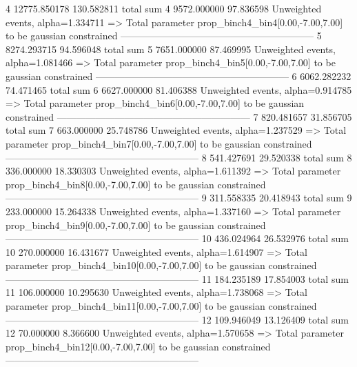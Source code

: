 4          12775.850178    130.582811      total sum                     
4          9572.000000     97.836598       Unweighted events, alpha=1.334711
  => Total parameter prop_binch4_bin4[0.00,-7.00,7.00] to be gaussian constrained
------------------------------------------------------------
5          8274.293715     94.596048       total sum                     
5          7651.000000     87.469995       Unweighted events, alpha=1.081466
  => Total parameter prop_binch4_bin5[0.00,-7.00,7.00] to be gaussian constrained
------------------------------------------------------------
6          6062.282232     74.471465       total sum                     
6          6627.000000     81.406388       Unweighted events, alpha=0.914785
  => Total parameter prop_binch4_bin6[0.00,-7.00,7.00] to be gaussian constrained
------------------------------------------------------------
7          820.481657      31.856705       total sum                     
7          663.000000      25.748786       Unweighted events, alpha=1.237529
  => Total parameter prop_binch4_bin7[0.00,-7.00,7.00] to be gaussian constrained
------------------------------------------------------------
8          541.427691      29.520338       total sum                     
8          336.000000      18.330303       Unweighted events, alpha=1.611392
  => Total parameter prop_binch4_bin8[0.00,-7.00,7.00] to be gaussian constrained
------------------------------------------------------------
9          311.558335      20.418943       total sum                     
9          233.000000      15.264338       Unweighted events, alpha=1.337160
  => Total parameter prop_binch4_bin9[0.00,-7.00,7.00] to be gaussian constrained
------------------------------------------------------------
10         436.024964      26.532976       total sum                     
10         270.000000      16.431677       Unweighted events, alpha=1.614907
  => Total parameter prop_binch4_bin10[0.00,-7.00,7.00] to be gaussian constrained
------------------------------------------------------------
11         184.235189      17.854003       total sum                     
11         106.000000      10.295630       Unweighted events, alpha=1.738068
  => Total parameter prop_binch4_bin11[0.00,-7.00,7.00] to be gaussian constrained
------------------------------------------------------------
12         109.946049      13.126409       total sum                     
12         70.000000       8.366600        Unweighted events, alpha=1.570658
  => Total parameter prop_binch4_bin12[0.00,-7.00,7.00] to be gaussian constrained
------------------------------------------------------------
